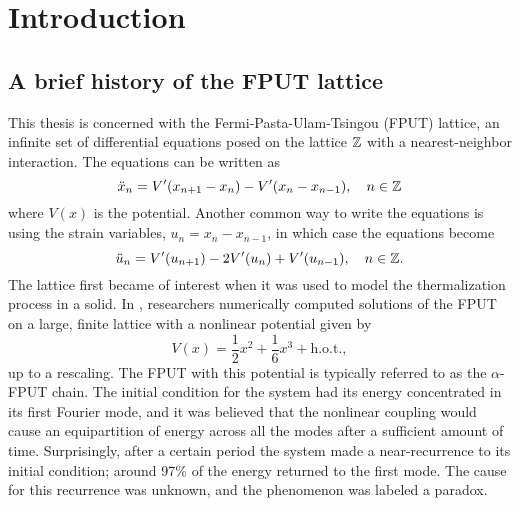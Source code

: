 
\chapter{Introduction}

\section{A brief history of the FPUT lattice}

This thesis is concerned with the Fermi-Pasta-Ulam-Tsingou (FPUT) lattice, an infinite set of differential equations posed on the lattice \(\mathbb{Z}\) with a nearest-neighbor interaction. The equations can be written as
\begin{equation}\label{fput-lattice-odes}
	\ddot x_n = V'(x_{n+1}- x_n) - V'(x_n - x_{n-1}), \quad n\in \mathbb{Z}
\end{equation}
where \(V(x)\) is the potential. Another common way to write the equations is using the strain variables, \(u_n = x_ n - x_{n-1}\), in which case the equations become
\begin{equation}\label{fput-lattice-equations-strain-variables}
	\ddot{u}_n = V'(u_{n+1}) - 2 V'(u_n) + V'(u_{n-1}), \quad n \in \mathbb{Z}.
\end{equation}
The lattice first became of interest when it was used to model the thermalization process in a solid. In \cite{fermi1955studies}, researchers numerically computed solutions of the FPUT on a large, finite lattice with a nonlinear potential given by
\begin{equation}
	V(x) = \frac 1 2 x^2 + \frac 1 6 x^3 + \text{h.o.t.},
\end{equation}
up to a rescaling. The FPUT with this potential is typically referred to as the \(\alpha\)-FPUT chain. The initial condition for the system had its energy concentrated in its first Fourier mode, and it was believed that the nonlinear coupling would cause an equipartition of energy across all the modes after a sufficient amount of time. Surprisingly, after a certain period the system made a near-recurrence to its initial condition; around 97\% of the energy returned to the first mode. The cause for this recurrence was unknown, and the phenomenon was labeled a paradox. 

